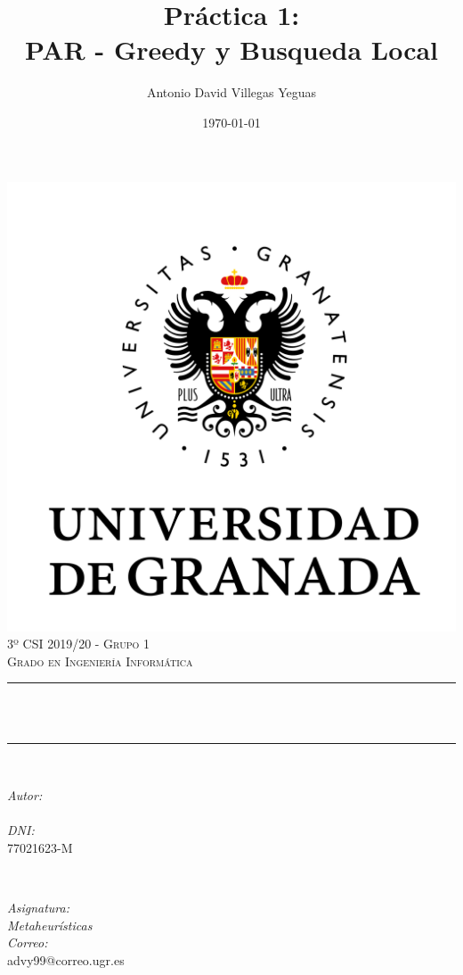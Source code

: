 \documentclass[12pt, spanish]{article}
\title{Práctica 1:\\
PAR - Greedy y Busqueda Local  \hspace{0.05cm} }
\author{Antonio David Villegas Yeguas}
\date{\today}
\makeatletter
\let\thetitle\@title
\let\theauthor\@author
\makeatother
\begin{document}

\begin{titlepage}
    \centering
    \vspace*{0.3 cm}
    \includegraphics[scale = 0.50]{ugr.png}\\[0.7 cm]
    \textsc{\large 3º CSI 2019/20 - Grupo 1}\\[0.5 cm]            
    \textsc{\large Grado en Ingeniería Informática}\\[0.5 cm]              
    \rule{\linewidth}{0.2 mm} \\[0.2 cm]
    { \huge \bfseries \thetitle}\\
    \rule{\linewidth}{0.2 mm} \\[1 cm]
    
    \begin{minipage}{0.4\textwidth}
        \begin{flushleft} \large
            \emph{Autor:}\\
            \theauthor\\ 
			 \emph{DNI:}\\
            77021623-M
            \end{flushleft}
            \end{minipage}~
            \begin{minipage}{0.4\textwidth}
            \begin{flushright} \large
            \emph{Asignatura: \\
            Metaheurísticas}   \\     
            \emph{Correo:}\\
            advy99@correo.ugr.es           
        \end{flushright}
    \end{minipage}\\[0.5cm]
  

\end{titlepage}
\end{document}
